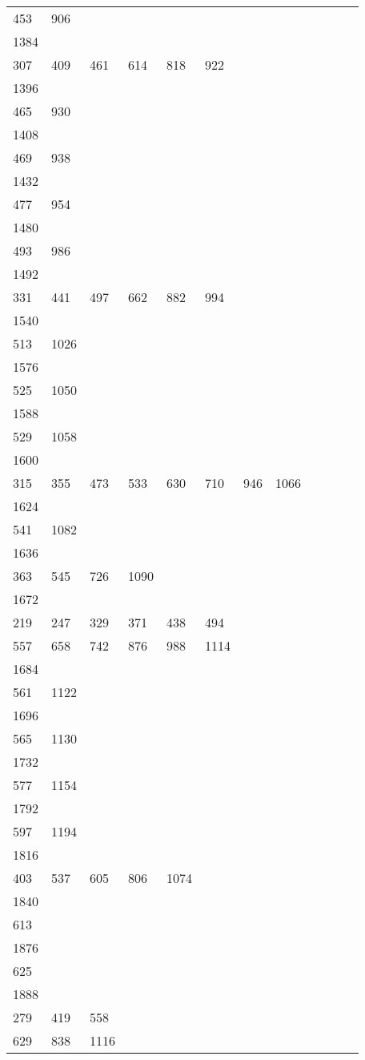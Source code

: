\begin{longtable}{llllllllllll}
453& 906& \\
1384&&&&&&&&&&&\\
307& 409& 461& 614& 818& 922& \\
1396&&&&&&&&&&&\\
465& 930& \\
1408&&&&&&&&&&&\\
469& 938\\
1432&&&&&&&&&&&\\
477& 954& \\
1480&&&&&&&&&&&\\
493& 986& \\
1492&&&&&&&&&&&\\
331& 441& 497& 662& 882& 994& \\
1540&&&&&&&&&&&\\
513& 1026\\
1576&&&&&&&&&&&\\
525& 1050& \\
1588&&&&&&&&&&&\\
529& 1058& \\
1600&&&&&&&&&&&\\
315& 355& 473& 533& 630& 710& 946& 1066\\
1624&&&&&&&&&&&\\
541& 1082& \\
1636&&&&&&&&&&&\\
363& 545& 726& 1090& \\
1672&&&&&&&&&&&\\
219& 247& 329& 371& 438& 494\\
557& 658& 742& 876& 988& 1114& \\
1684&&&&&&&&&&&\\
561& 1122& \\
1696&&&&&&&&&&&\\
565& 1130& \\
1732&&&&&&&&&&&\\
577& 1154\\
1792&&&&&&&&&&&\\
597& 1194& \\
1816&&&&&&&&&&&\\
403& 537& 605& 806& 1074& \\
1840&&&&&&&&&&&\\
613& \\
1876&&&&&&&&&&&\\
625& \\
1888&&&&&&&&&&&\\
279& 419& 558\\
629& 838& 1116& \\

\end{longtable}
